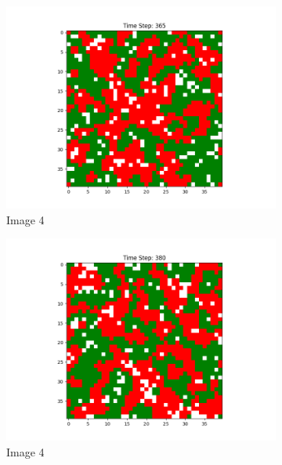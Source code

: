 \documentclass[12pt]{article}
\begin{document}
\begin{figure}[h]
		\begin{subfigure}{0.2\textwidth}
			\includegraphics[width=\linewidth]{final_social_n5p3.png}
			\caption{Image 4}
		\end{subfigure}\hspace{0.02\textwidth}
		\begin{subfigure}{0.2\textwidth}
			\includegraphics[width=\linewidth]{final_social_n5p5.png}
			\caption{Image 4}
		\end{subfigure}\hspace{0.02\textwidth}
		\begin{subfigure}{0.2\textwidth}

\end{subfigure}
\end{figure}
\end{document}
